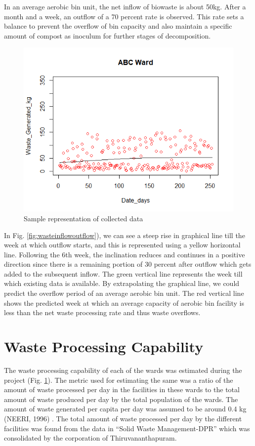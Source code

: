 \documentclass[12pt,a4paper]{report}
\begin{document}
In an average aerobic bin unit, the net inflow of biowaste is about 50kg. After a month and a week, an outflow of a 70 percent rate is observed. This rate sets a balance to prevent the overflow of bin capacity and also maintain a specific amount of compost as inoculum for further stages of decomposition. 

\begin{figure}[H]
	\centering
	\includegraphics[width=0.7\linewidth]{abc_ward}
	\caption{Sample representation of collected data}
	\label{fig:abcward}
\end{figure}

In Fig. \ref{fig:wasteinflowoutflow}), we can see a steep rise in graphical line till the week at which outflow starts, and this is represented using a yellow horizontal line. Following the 6th week, the inclination reduces and continues in a positive direction since there is a remaining portion of 30 percent after outflow which gets added to the subsequent inflow. The green vertical line represents the week till which existing data is available. By extrapolating the graphical line, we could predict the overflow period of an average aerobic bin unit. The red vertical line shows the predicted week at which an average capacity of aerobic bin facility is less than the net waste processing rate and thus waste overflows.

\section{Waste Processing Capability}

The waste processing capability of each of the wards was estimated during the project (Fig. \ref{fig:abcward}). The metric used for estimating the same was a ratio of the amount of waste processed per day in the facilities in these wards to the total amount of waste produced per day by the total population of the wards. The amount of waste generated per capita per day was assumed to be around 0.4 kg (NEERI, 1996) \cite{neeri}.
The total amount of waste processed per day by the different facilities was found from the data in “Solid Waste Management-DPR” which was consolidated by the corporation of Thiruvananthapuram.
\end{document}
